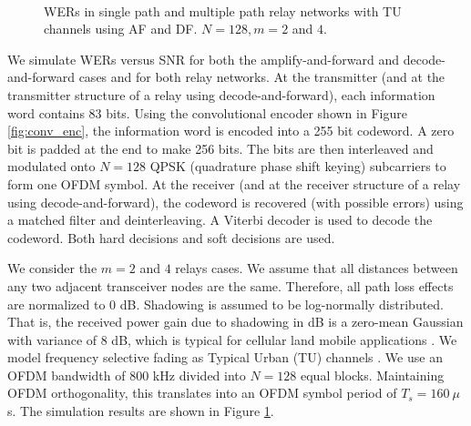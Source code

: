 \documentclass[conference]{IEEEtran}
\begin{document}
\begin{figure}
{     \\
} \caption{WERs in single path and multiple path relay networks
with TU channels using AF and DF.  $N = 128, m = 2$ and $4$.}
\label{fig:plots}
\end{figure}

We simulate WERs versus SNR for both the amplify-and-forward and decode-and-forward cases and for both relay networks.  At the transmitter (and at the transmitter structure of a relay using decode-and-forward), each information word contains 83 bits.  Using the convolutional encoder shown in Figure \ref{fig:conv_enc}, the information word is encoded into a 255 bit codeword.  A zero bit is padded at the end to make 256 bits.  The bits are then interleaved and modulated onto $N = 128$ QPSK (quadrature phase shift keying) subcarriers to form one OFDM symbol.  At the receiver (and at the receiver structure of a relay using decode-and-forward), the codeword is recovered (with possible errors) using a matched filter and deinterleaving.  A Viterbi decoder is used to decode the codeword.  Both hard decisions and soft decisions are used.

We consider the $m = 2$ and $4$ relays cases.  We assume that all distances between any two adjacent transceiver nodes are the same.  Therefore, all path loss effects are normalized to 0 dB.  Shadowing is assumed to be log-normally distributed.  That is, the received power gain due to shadowing in dB is a zero-mean Gaussian with variance of 8 dB, which is typical for cellular land mobile applications \cite{book:Stuber01}.  We model frequency selective fading as Typical Urban (TU) channels \cite{book:Stuber01}.  We use an OFDM bandwidth of 800 kHz divided into $N = 128$ equal blocks.  Maintaining OFDM orthogonality, this translates into an OFDM symbol period of $T_s = 160 \:\mu$s.  The simulation results are shown in Figure \ref{fig:plots}.
\end{document}
